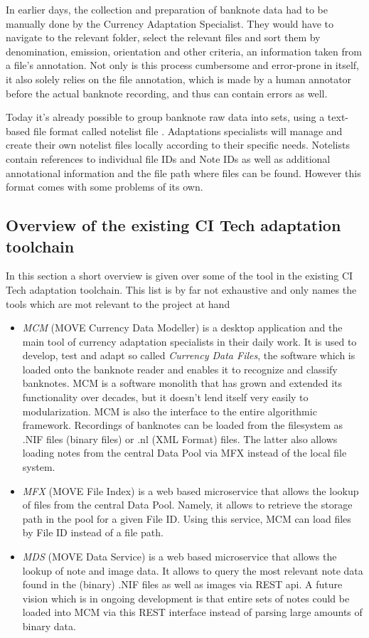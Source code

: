 In earlier days, the collection and preparation of banknote data had to be manually done by the Currency Adaptation Specialist. They would have to navigate to the relevant folder, select the relevant files and sort them by denomination, emission, orientation and other criteria, an information taken from a file's annotation. Not only is this process cumbersome and error-prone in itself, it also solely relies on the file annotation, which is made by a human annotator before the actual banknote recording, and thus can contain errors as well. \par
Today it's already possible to group banknote raw data into sets, using a text-based file format called notelist file . Adaptations specialists will manage and create their own notelist files locally according to their specific needs. Notelists contain references to individual file IDs and Note IDs as well as additional annotational information and the file path where files can be found. However this format comes with some problems of its own.\par

\subsection{Overview of the existing CI Tech adaptation toolchain }

In this section a short overview is given over some of the tool in the existing CI Tech adaptation toolchain. This list is by far not exhaustive and only names the tools which are mot relevant to the project at hand
\begin{itemize}
\item \emph{MCM} (MOVE Currency Data Modeller) is a desktop application and the main tool of currency adaptation specialists in their daily work. It is used to develop, test and adapt so called \emph{Currency Data Files}, the software which is loaded onto the banknote reader and enables it to recognize and classify banknotes. MCM is a software monolith that has grown and extended its functionality over decades, but it doesn't lend itself very easily to modularization. MCM is also the interface to the entire algorithmic framework. Recordings of banknotes can be loaded from the filesystem as .NIF files (binary files) or .nl (XML Format) files. The latter also allows loading notes from the central Data Pool via MFX instead of the local file system.

\item \emph{MFX} (MOVE File Index) is a web based microservice that allows the lookup of files from the central Data Pool. Namely, it allows to retrieve the storage path in the pool for a given File ID. Using this service, MCM can load files by File ID instead of a file path.

\item \emph{MDS} (MOVE Data Service) is a web based microservice that allows the lookup of note and image data. It allows to query the most relevant note data found in the (binary) .NIF files as well as images via REST api. A future vision which is in ongoing development is that entire sets of notes could be loaded into MCM via this REST interface instead of parsing large amounts of binary data. 


\end{itemize}
